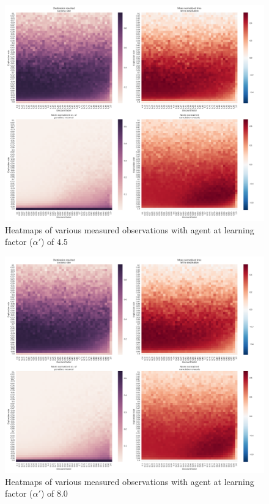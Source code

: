 \documentclass{article}
\begin{document}
	\begin{figure}[b]
		\centering
		\includegraphics[scale=0.38]{plots_learning_4_5}
		\caption{Heatmaps of various measured observations with agent at learning factor ($\alpha\prime$) of $4.5$}
		\label{fig:learning_4_5}
	\end{figure}
	
	\begin{figure}[b]
		\centering
		\includegraphics[scale=0.38]{plots_learning_8}
		\caption{Heatmaps of various measured observations with agent at learning factor ($\alpha\prime$) of $8.0$}
		\label{fig:learning_8}
	\end{figure}
		
\end{document}
